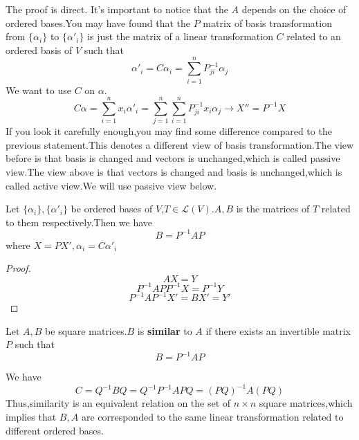 \documentclass{article}
\begin{document}
The proof is direct.
It's important to notice that the $A$ depends on the choice of ordered bases.You may have found that the $P$ matrix of basis transformation from $\{\alpha_i\}$ to $\{\alpha'_i\}$ is just the matrix of a linear transformation $C$ related to an ordered basis of $V$ such that
\[\alpha'_i=C\alpha_i=\sum\limits_{i=1}^nP^{-1}_{ji}\alpha_j\]
We want to use $C$ on $\alpha$.
\[C\alpha=\sum\limits_{i=1}^nx_i\alpha'_i=\sum\limits_{j=1}^n\sum\limits_{i=1}^nP^{-1}_{ji}x_i\alpha_j\rightarrow X''=P^{-1}X\]
If you look it carefully enough,you may find some difference compared to the previous statement.This denotes a different view of basis transformation.The view before is that basis is changed and vectors is unchanged,which is called passive view.The view above is that vectors is changed and basis is unchanged,which is called active view.We will use passive view below.\\
\begin{thm}
	Let $\{\alpha_i\},\{\alpha'_i\}$ be ordered bases of $V$,$T\in\mathcal{L}(V)$.$A,B$ is the matrices of $T$ related to them respectively.Then we have
	\[B=P^{-1}AP\]
	where $X=PX',\alpha_i=C\alpha'_i$
\end{thm}
\begin{proof}
	\[AX=Y\]
	\[P^{-1}APP^{-1}X=P^{-1}Y\]
	\[P^{-1}AP^{-1}X'=BX'=Y'\]
\end{proof}
\begin{dde}
	Let $A,B$ be square matrices.$B$ is \textbf{similar} to $A$ if there exists an invertible matrix $P$ such that
	\[B=P^{-1}AP\]
\end{dde}
We have
\[C=Q^{-1}BQ=Q^{-1}P^{-1}APQ=(PQ)^{-1}A(PQ)\]
Thus,similarity is an equivalent relation on the set of $n\times n$ square matrices,which implies that $B,A$ are corresponded to the same linear transformation related to different ordered bases.
\end{document}
